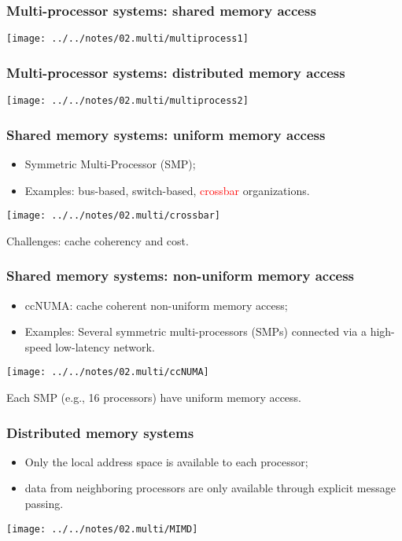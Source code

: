 \documentclass{beamer}
\begin{document}
\begin{frame}\frametitle{Multi-processor systems: shared memory access}
\begin{center}
\texttt{[image: ../../notes/02.multi/multiprocess1]}
\end{center}
\end{frame}

\begin{frame}\frametitle{Multi-processor systems: distributed memory access}
\begin{center}
\texttt{[image: ../../notes/02.multi/multiprocess2]}
\end{center}
\end{frame}

\begin{frame}\frametitle{Shared memory systems: uniform memory access}
\begin{itemize}
\item Symmetric Multi-Processor (SMP); 
\item Examples: bus-based, switch-based, \textcolor{red}{crossbar} organizations.
\end{itemize}
\vspace{.2cm}
\begin{center}
\texttt{[image: ../../notes/02.multi/crossbar]}
\end{center}
Challenges: cache coherency and cost.
\end{frame}

\begin{frame}\frametitle{Shared memory systems: non-uniform memory access}
\begin{itemize}
\vspace{.2cm}
\item ccNUMA: cache coherent non-uniform memory access;
\vspace{.2cm}
\item Examples: Several symmetric multi-processors (SMPs) connected via a high-speed 
low-latency network. 
\end{itemize}
\vspace{.3cm}
\begin{center}
\texttt{[image: ../../notes/02.multi/ccNUMA]}
\end{center}
Each SMP (e.g., 16 processors) have uniform memory access. 
\end{frame}

\begin{frame}\frametitle{Distributed memory systems}
\begin{itemize}
\item Only the local address space is available to each processor;
\vspace{.2cm}
\item data from neighboring processors are only available through explicit 
message passing.
\end{itemize}
\vspace{.2cm}
\begin{center}
\texttt{[image: ../../notes/02.multi/MIMD]}
\end{center} 
\end{frame}
\end{document}
